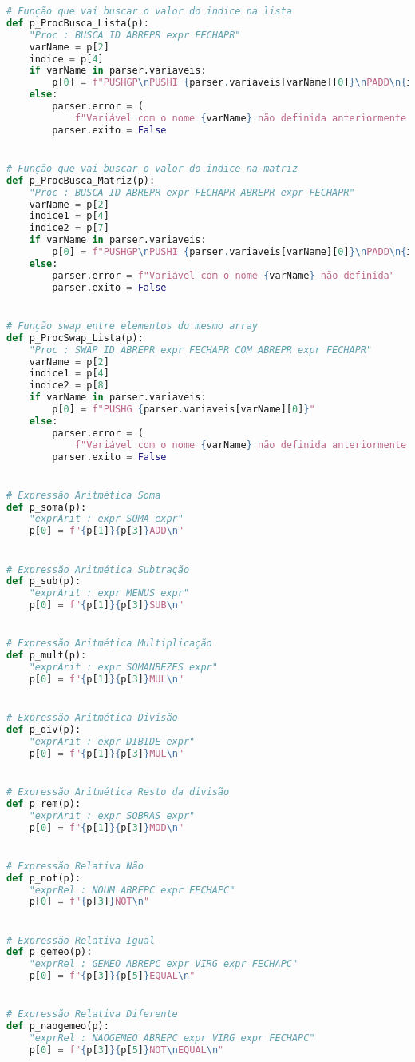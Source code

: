 \documentclass[11pt,a4paper]{report}%
\begin{document}
\begin{scriptsize}
\begin{lstlisting}[language=python]
# Função que vai buscar o valor do indice na lista
def p_ProcBusca_Lista(p):
    "Proc : BUSCA ID ABREPR expr FECHAPR"
    varName = p[2]
    indice = p[4]
    if varName in parser.variaveis:
        p[0] = f"PUSHGP\nPUSHI {parser.variaveis[varName][0]}\nPADD\n{indice}LOADN\n"
    else:
        parser.error = (
            f"Variável com o nome {varName} não definida anteriormente.")
        parser.exito = False


# Função que vai buscar o valor do indice na matriz
def p_ProcBusca_Matriz(p):
    "Proc : BUSCA ID ABREPR expr FECHAPR ABREPR expr FECHAPR"
    varName = p[2]
    indice1 = p[4]
    indice2 = p[7]
    if varName in parser.variaveis:
        p[0] = f"PUSHGP\nPUSHI {parser.variaveis[varName][0]}\nPADD\n{indice1}PUSHI {parser.variaveis[varName][2]}\nMUL\nPADD\n{indice2}LOADN\n"
    else:
        parser.error = f"Variável com o nome {varName} não definida"
        parser.exito = False


# Função swap entre elementos do mesmo array
def p_ProcSwap_Lista(p):
    "Proc : SWAP ID ABREPR expr FECHAPR COM ABREPR expr FECHAPR"
    varName = p[2]
    indice1 = p[4]
    indice2 = p[8]
    if varName in parser.variaveis:
        p[0] = f"PUSHG {parser.variaveis[varName][0]}"
    else:
        parser.error = (
            f"Variável com o nome {varName} não definida anteriormente.")
        parser.exito = False


# Expressão Aritmética Soma
def p_soma(p):
    "exprArit : expr SOMA expr"
    p[0] = f"{p[1]}{p[3]}ADD\n"


# Expressão Aritmética Subtração
def p_sub(p):
    "exprArit : expr MENUS expr"
    p[0] = f"{p[1]}{p[3]}SUB\n"


# Expressão Aritmética Multiplicação
def p_mult(p):
    "exprArit : expr SOMANBEZES expr"
    p[0] = f"{p[1]}{p[3]}MUL\n"


# Expressão Aritmética Divisão
def p_div(p):
    "exprArit : expr DIBIDE expr"
    p[0] = f"{p[1]}{p[3]}MUL\n"


# Expressão Aritmética Resto da divisão
def p_rem(p):
    "exprArit : expr SOBRAS expr"
    p[0] = f"{p[1]}{p[3]}MOD\n"


# Expressão Relativa Não
def p_not(p):
    "exprRel : NOUM ABREPC expr FECHAPC"
    p[0] = f"{p[3]}NOT\n"


# Expressão Relativa Igual
def p_gemeo(p):
    "exprRel : GEMEO ABREPC expr VIRG expr FECHAPC"
    p[0] = f"{p[3]}{p[5]}EQUAL\n"


# Expressão Relativa Diferente
def p_naogemeo(p):
    "exprRel : NAOGEMEO ABREPC expr VIRG expr FECHAPC"
    p[0] = f"{p[3]}{p[5]}NOT\nEQUAL\n"



\end{lstlisting}
\end{scriptsize}
\end{document}
